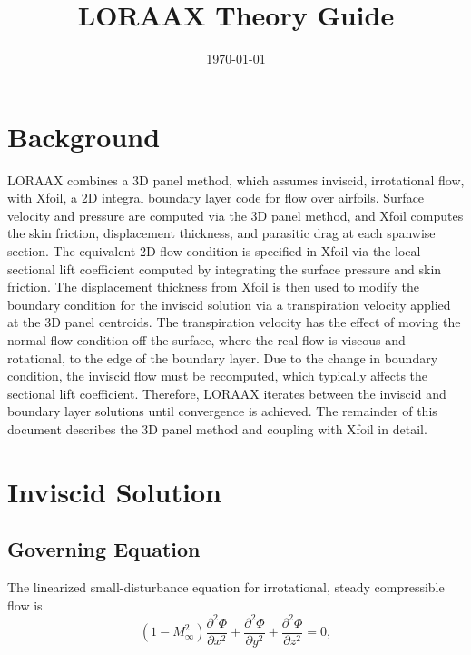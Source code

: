 \documentclass[11pt]{article}
\begin{document}
\title{LORAAX Theory Guide}
\date{\today}
\maketitle

\tableofcontents

\section{Background}

LORAAX combines a 3D panel method, which assumes inviscid, irrotational flow,
with Xfoil, a 2D integral boundary layer code for flow over airfoils. Surface
velocity and pressure are computed via the 3D panel method, and Xfoil computes
the skin friction, displacement thickness, and parasitic drag at each spanwise
section. The equivalent 2D flow condition is specified in Xfoil via the local
sectional lift coefficient computed by integrating the surface pressure and
skin friction. The displacement thickness from Xfoil is then used to modify the
boundary condition for the inviscid solution via a transpiration velocity
applied at the 3D panel centroids. The transpiration velocity has the effect
of moving the normal-flow condition off the surface, where the real flow is
viscous and rotational, to the edge of the boundary layer. Due to the change in
boundary condition, the inviscid flow must be recomputed, which typically
affects the sectional lift coefficient. Therefore, LORAAX iterates between the
inviscid and boundary layer solutions until convergence is achieved. The
remainder of this document describes the 3D panel method and coupling with
Xfoil in detail.

\section{Inviscid Solution}\label{sec:inviscid}

\subsection{Governing Equation}

The linearized small-disturbance equation for irrotational, steady compressible
flow is
\begin{equation}
	(1 - M_\infty^2)\frac{\partial^2\Phi}{\partial x^2} +
	                \frac{\partial^2\Phi}{\partial y^2} +
	                \frac{\partial^2\Phi}{\partial z^2} = 0,
	\label{eq:small_disturbance}
\end{equation}
\end{document}
